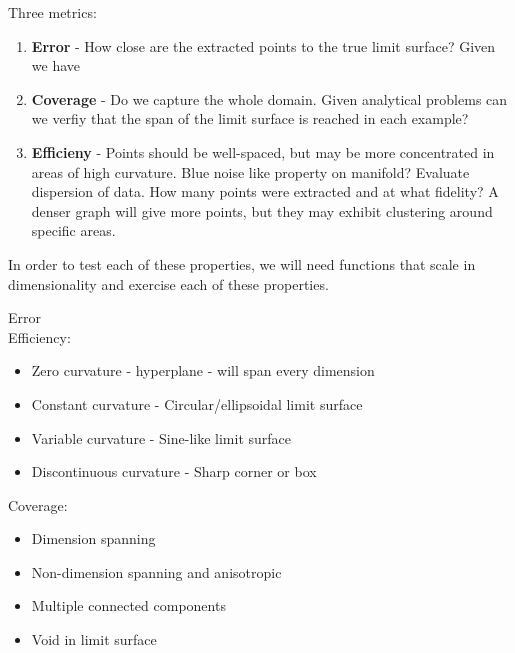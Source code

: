 \documentclass[12pt]{article}
\begin{document}
Three metrics:
\begin{enumerate}
	\item \textbf{Error} - How close are the extracted points to the true limit surface? Given we have 
	\item \textbf{Coverage} - Do we capture the whole domain. Given analytical problems can we verfiy that
	the span of the limit surface is reached in each example?
	\item \textbf{Efficieny} - Points should be well-spaced, but may be more concentrated in areas of high curvature.
	Blue noise like property on manifold? Evaluate dispersion of data. How many points were extracted and at what fidelity?
	A denser graph will give more points, but they may exhibit clustering around specific areas.
\end{enumerate}

In order to test each of these properties, we will need functions that scale in dimensionality and exercise each of these properties.

Error\\Efficiency:

\begin{itemize}
	\item Zero curvature - hyperplane - will span every dimension
	\item Constant curvature - Circular/ellipsoidal limit surface
	\item Variable curvature - Sine-like limit surface
	\item Discontinuous curvature - Sharp corner or box
\end{itemize}

Coverage:

\begin{itemize}
	\item Dimension spanning
	\item Non-dimension spanning and anisotropic
	\item Multiple connected components
	\item Void in limit surface
\end{itemize}



\end{document}

